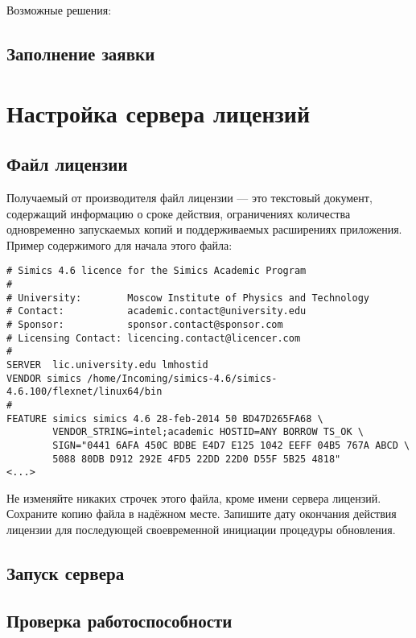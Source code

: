 Возможные решения:




\subsection{Заполнение заявки}




\section{Настройка сервера лицензий}


\subsection{Файл лицензии}

Получаемый от производителя файл лицензии --- это текстовый документ, содержащий информацию о сроке действия, ограничениях количества одновременно запускаемых копий и поддерживаемых расширениях приложения. Пример содержимого для начала этого файла:

\begin{lstlisting}
# Simics 4.6 licence for the Simics Academic Program
#
# University:        Moscow Institute of Physics and Technology
# Contact:           academic.contact@university.edu
# Sponsor:           sponsor.contact@sponsor.com
# Licensing Contact: licencing.contact@licencer.com
#
SERVER  lic.university.edu lmhostid
VENDOR simics /home/Incoming/simics-4.6/simics-4.6.100/flexnet/linux64/bin
#
FEATURE simics simics 4.6 28-feb-2014 50 BD47D265FA68 \
        VENDOR_STRING=intel;academic HOSTID=ANY BORROW TS_OK \
        SIGN="0441 6AFA 450C BDBE E4D7 E125 1042 EEFF 04B5 767A ABCD \
        5088 80DB D912 292E 4FD5 22DD 22D0 D55F 5B25 4818"
<...>
\end{lstlisting}

Не изменяйте никаких строчек этого файла, кроме имени сервера лицензий. Сохраните копию файла в надёжном месте. Запишите дату окончания действия лицензии для последующей своевременной инициации процедуры обновления.

\subsection{Запуск сервера}

\subsection{Проверка работоспособности}



